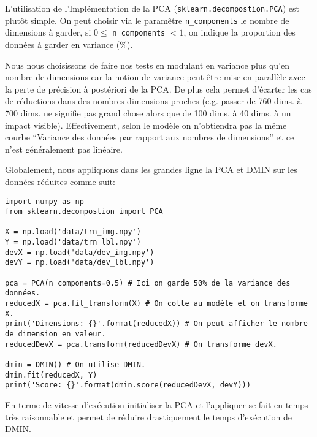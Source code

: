 \documentclass[12pt,a4paper]{article}
\begin{document}
{L'utilisation de l'Implémentation de la PCA (\lstinline[style=default]|sklearn.decompostion.PCA|) est plutôt simple. 
On peut choisir via le paramêtre \lstinline[style=default]|n_components| le nombre de dimensions à garder, \linebreak[4] si $0 \leq$  \lstinline[style=default]|n_components| $< 1$, on indique la proportion des données à garder en variance (\%).

Nous nous choisissons de faire nos tests en modulant en variance plus qu'en nombre de dimensions car la notion de variance peut être mise en parallèle avec la perte de précision à postériori de la PCA.
De plus cela permet d'écarter les cas de réductions dans des nombres dimensions proches (e.g. passer de 760 dims. à 700 dims. ne signifie pas grand chose alors que de 100 dims. à 40 dims. à un impact visible). Effectivement, selon le modèle on n'obtiendra pas la même courbe ``Variance des données par rapport aux nombres de dimensions'' et ce n'est généralement pas linéaire.

Globalement, nous appliquons dans les grandes ligne la PCA et DMIN sur les données réduites comme suit:
\begin{lstlisting}[style=darkula]
import numpy as np
from sklearn.decompostion import PCA

X = np.load('data/trn_img.npy')
Y = np.load('data/trn_lbl.npy')
devX = np.load('data/dev_img.npy')
devY = np.load('data/dev_lbl.npy')

pca = PCA(n_components=0.5) # Ici on garde 50% de la variance des données.
reducedX = pca.fit_transform(X) # On colle au modèle et on transforme X.
print('Dimensions: {}'.format(reducedX)) # On peut afficher le nombre de dimension en valeur.
reducedDevX = pca.transform(reducedDevX) # On transforme devX.

dmin = DMIN() # On utilise DMIN.
dmin.fit(reducedX, Y)
print('Score: {}'.format(dmin.score(reducedDevX, devY)))

\end{lstlisting}

En terme de vitesse d'exécution initialiser la PCA et l'appliquer se fait en temps très raisonnable et permet de réduire drastiquement le temps d'exécution de DMIN.

}
\end{document}

